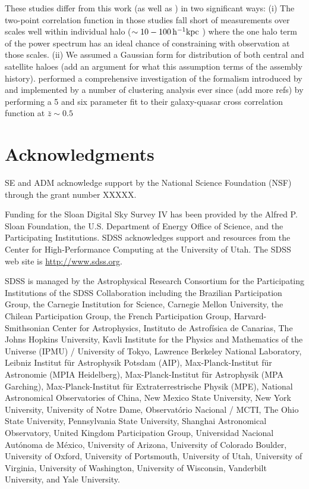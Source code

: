 \documentclass[useAMS,usenatbib]{mn2e}
\begin{document}
 These studies differ from this work (as well as \citep{ko12}) in two 
significant ways: (i) The two-point correlation function in those studies fall 
short of measurements over scales well within individual halo ($\sim 10-100 \, 
\rm h^{-1} kpc$ ) where the one halo term of the power spectrum has an ideal 
chance of constraining with observation at those scales. (ii) We assumed a 
Gaussian form for distribution of both central and satellite haloes (add an 
argument for what this assumption terms of the assembly history). \citet{sh13} 
performed a comprehensive investigation of the formalism introduced by 
\citet{zh05} and implemented by a number of clustering analysis ever since 
\citep{zh07,mi11,zeh11,ric12,ric13}(add more refs) by performing a 5 and six 
parameter fit to their galaxy-quasar cross correlation function at $\bar z \sim 
0.5$  
 
\section*{Acknowledgments}
SE and ADM acknowledge support by the National Science Foundation (NSF) through the 
grant number XXXXX. 

Funding for the Sloan Digital Sky Survey IV has been provided by the Alfred P. 
Sloan Foundation, the U.S. Department of Energy Office of Science, and the 
Participating Institutions. SDSS acknowledges support and resources from the 
Center for High-Performance Computing at the University of Utah. The SDSS web 
site is \url{http://www.sdss.org}.

SDSS is managed by the Astrophysical Research Consortium for the Participating 
Institutions of the SDSS Collaboration including the Brazilian Participation 
Group, the Carnegie Institution for Science, Carnegie Mellon University, the 
Chilean Participation Group, the French Participation Group, Harvard-Smithsonian 
Center for Astrophysics, Instituto de Astrof\'{i}sica de Canarias, The Johns 
Hopkins University, Kavli Institute for the Physics and Mathematics of the 
Universe (IPMU) / University of Tokyo, Lawrence Berkeley National Laboratory, 
Leibniz Institut f\"{u}r Astrophysik Potsdam (AIP), Max-Planck-Institut f\"{u}r 
Astronomie (MPIA Heidelberg), Max-Planck-Institut für Astrophysik (MPA 
Garching), Max-Planck-Institut für Extraterrestrische Physik (MPE), National 
Astronomical Observatories of China, New Mexico State University, New York 
University, University of Notre Dame, Observatório Nacional / MCTI, The Ohio 
State University, Pennsylvania State University, Shanghai Astronomical 
Observatory, United Kingdom Participation Group, Universidad Nacional 
Aut\'{o}noma de M\'{e}xico, University of Arizona, University of Colorado 
Boulder, University of Oxford, University of Portsmouth, University of Utah, 
University of Virginia, University of Washington, University of Wisconsin, 
Vanderbilt University, and Yale University.
\newpage


\end{document}

